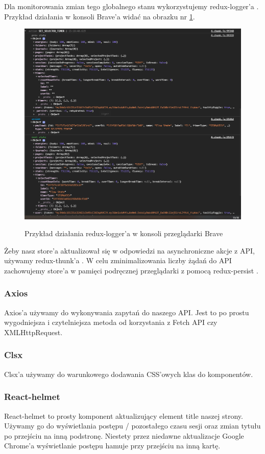 \documentclass[a4paper,11pt]{report}
\begin{document}
Dla monitorowania zmian tego globalnego stanu wykorzystujemy redux-logger'a \cite{redux-logger}.
Przykład działania w konsoli Brave'a widać na obrazku nr \ref{fig:redux_logger}.
\begin{figure}[H]
	\centering
	\includegraphics[scale=0.55]{implementacja/frontend/redux_logger}\\
	\caption{Przykład działania redux-logger'a w konsoli przeglądarki Brave}
	\label{fig:redux_logger}
\end{figure}
Żeby nasz store'a aktualizował się w odpowiedzi na asynchroniczne akcje z API, używamy redux-thunk'a \cite{redux-thunk}.
W celu zminimalizowania liczby żądań do API zachowujemy store'a w pamięci podręcznej przeglądarki z pomocą redux-persist \cite{redux-persist}.

\subsubsection{Axios}
Axios'a \cite{axios} używamy do wykonywania zapytań do naszego API.
 Jest to po prostu wygodniejsza i czytelniejsza metoda od korzystania z Fetch API czy XMLHttpRequest.
\subsubsection{Clsx}
Clsx'a \cite{clsx} używamy do warunkowego dodawania CSS'owych klas do komponentów.

\subsubsection{React-helmet}
React-helmet\cite{react-helmet} to prosty komponent aktualizujący element title naszej strony.
 Używamy go do wyświetlania postępu / pozostałego czasu sesji oraz zmian tytułu po przejściu na inną podstronę.
 Niestety przez niedawne aktualizacje Google Chrome'a wyświetlanie postępu hamuje przy przejściu na inną kartę.
\end{document}
